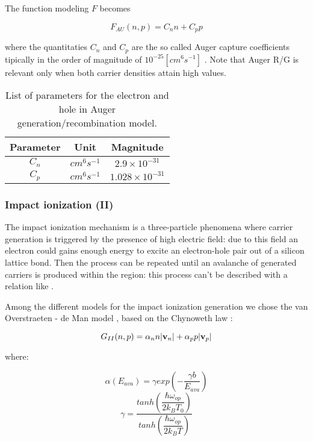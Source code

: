 The function modeling $F$ becomes

\begin{equation}
F_{AU}(n,p) = C_nn+C_pp
\end{equation}

where the quantitaties $C_n$ and $C_p$ are the so called  Auger capture coefficients tipically in the order of magnitude of $10^{-25}[cm^6s^{-1}]$ \cite{Lochmann}.
Note that Auger R/G is relevant only when both carrier densities attain high values.

\begin{table}[!h]
\centering
\begin{tabular}{ccc}
\toprule
Parameter & Unit & Magnitude \\
\midrule
$C_n$ & $cm^6s^{-1}$ & $2.9 \times 10^{-31}$ \\
$C_p$ & $cm^6s^{-1}$ & $1.028 \times 10^{-31}$ \\
\bottomrule
\end{tabular}
\caption{List of parameters for the electron and hole in Auger generation/recombination model.}
\end{table}

\subsubsection{Impact ionization (II)}
\label{sec: ImpactIonization}

The impact ionization mechanism is a three-particle phenomena where carrier generation is triggered by the presence of high electric field: due to this field an electron could gains enough energy to excite an electron-hole pair out of a silicon lattice bond. Then the process can be repeated until an avalanche of generated carriers is produced within the region: this process can't be described  with a relation like . 

Among the different models for the impact ionization generation we chose the van Overstraeten - de Man model \cite{VanOverII}, based on the Chynoweth law \cite{Cynoweth}:

\begin{equation}
G_{II}(n,p)= \alpha_n n |\mathbf{v}_n| + \alpha_p p |\mathbf{v}_p|
\end{equation}

where:

\begin{equation}
\alpha(E_{ava}) = \gamma exp\left(-\dfrac{\gamma b}{E_{ava}} \right)
\end{equation} 
\begin{equation}
\gamma = \dfrac{tanh\left(\dfrac{\hbar \omega_{op}}{2k_BT_0} \right) }{tanh\left(\dfrac{\hbar \omega_{op}}{2k_BT} \right)}
\end{equation}

